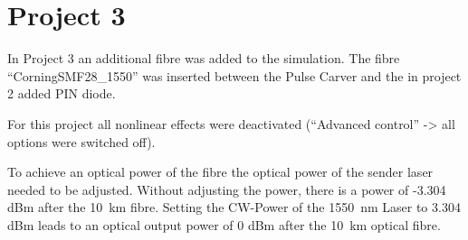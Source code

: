 \section{Project 3}
\label{sec:P3}
In Project 3 an additional fibre was added to the simulation. The fibre "`CorningSMF28\_1550"' was inserted between the Pulse Carver and the in project 2 added PIN diode. 

For this project all nonlinear effects were deactivated ("`Advanced control"' -> all options were switched off).

To achieve an optical power of the fibre the optical power of the sender laser needed to be adjusted. Without adjusting the power, there is a power of -3.304 dBm after the 10~km fibre. Setting the CW-Power of the 1550~nm Laser to 3.304 dBm leads to an optical output power of 0 dBm after the 10~km optical fibre.

